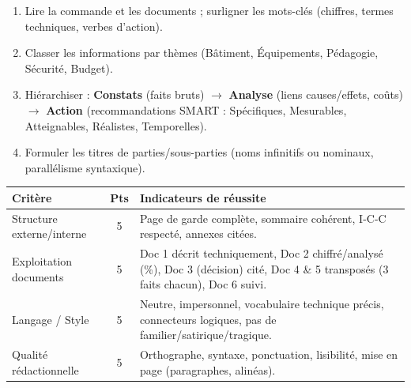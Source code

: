 \documentclass[11pt]{article}
\newcommand{\cle}[1]{{\popxbold\color{popdark}#1}}
\begin{document}
\begin{methode}
\begin{enumerate}
    \item Lire la commande et les documents ; surligner les \cle{mots-clés} (chiffres, termes techniques, verbes d'action).
    \item Classer les informations par \cle{thèmes} (Bâtiment, Équipements, Pédagogie, Sécurité, Budget).
    \item Hiérarchiser : \textbf{Constats} (faits bruts) $\rightarrow$ \textbf{Analyse} (liens causes/effets, coûts) $\rightarrow$ \textbf{Action} (recommandations SMART : Spécifiques, Mesurables, Atteignables, Réalistes, Temporelles).
    \item Formuler les titres de parties/sous-parties (noms infinitifs ou nominaux, parallélisme syntaxique).
\end{enumerate}
\end{methode}

\begin{aretenir}
\begin{center}
\begin{tabularx}{\linewidth}{|X|c|X|}\hline
\rowcolor{popblueL}
\textbf{Critère} & \textbf{Pts} & \textbf{Indicateurs de réussite} \\ \hline
Structure externe/interne & 5 & Page de garde complète, sommaire cohérent, I-C-C respecté, annexes citées. \\ \hline
Exploitation documents & 5 & Doc 1 décrit techniquement, Doc 2 chiffré/analysé (\%), Doc 3 (décision) cité, Doc 4 \& 5 transposés (3 faits chacun), Doc 6 suivi. \\ \hline
Langage / Style & 5 & Neutre, impersonnel, vocabulaire technique précis, connecteurs logiques, pas de familier/satirique/tragique. \\ \hline
Qualité rédactionnelle & 5 & Orthographe, syntaxe, ponctuation, lisibilité, mise en page (paragraphes, alinéas). \\ \hline
\end{tabularx}
\end{center}
\end{aretenir}
\end{document}
